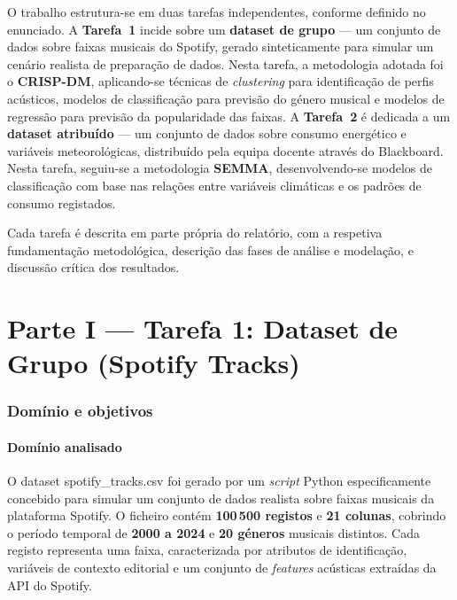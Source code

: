 \documentclass[11pt,a4paper]{article}
\newcommand{\code}[1]{{\ttfamily\hyphenchar\font=45\relax #1}}
\begin{document}
O trabalho estrutura-se em duas tarefas independentes, conforme definido no enunciado. A \textbf{Tarefa~1} incide sobre um \textbf{dataset de grupo} --- um conjunto de dados sobre faixas musicais do Spotify, gerado sinteticamente para simular um cenário realista de preparação de dados. Nesta tarefa, a metodologia adotada foi o \textbf{CRISP-DM}, aplicando-se técnicas de \textit{clustering} para identificação de perfis acústicos, modelos de classificação para previsão do género musical e modelos de regressão para previsão da popularidade das faixas. A \textbf{Tarefa~2} é dedicada a um \textbf{dataset atribuído} --- um conjunto de dados sobre consumo energético e variáveis meteorológicas, distribuído pela equipa docente através do Blackboard. Nesta tarefa, seguiu-se a metodologia \textbf{SEMMA}, desenvolvendo-se modelos de classificação com base nas relações entre variáveis climáticas e os padrões de consumo registados.

Cada tarefa é descrita em parte própria do relatório, com a respetiva fundamentação metodológica, descrição das fases de análise e modelação, e discussão crítica dos resultados.

\clearpage

\part*{Parte I --- Tarefa 1: Dataset de Grupo (Spotify Tracks)}

\section{Domínio e objetivos}

\subsection{Domínio analisado}

O dataset \code{spotify\_tracks.csv} foi gerado por um \textit{script} Python especificamente concebido para simular um conjunto de dados realista sobre faixas musicais da plataforma Spotify. O ficheiro contém \textbf{100\,500 registos} e \textbf{21 colunas}, cobrindo o período temporal de \textbf{2000 a 2024} e \textbf{20 géneros} musicais distintos. Cada registo representa uma faixa, caracterizada por atributos de identificação, variáveis de contexto editorial e um conjunto de \textit{features} acústicas extraídas da API do Spotify.
\end{document}
